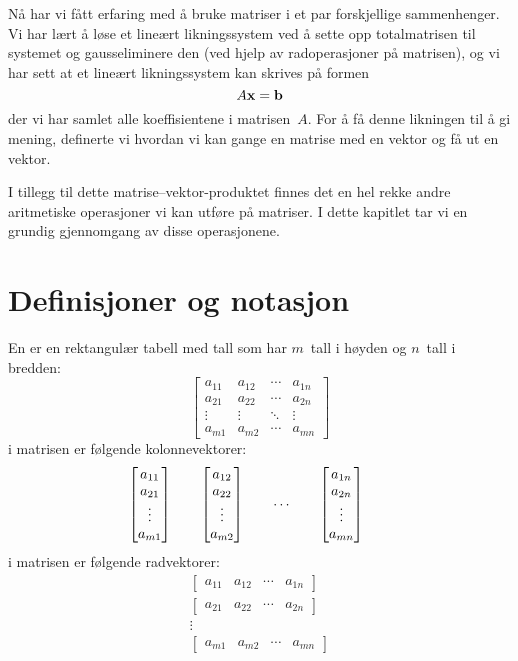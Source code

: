 

\label{ch:matriser}

Nå har vi fått erfaring med å bruke matriser i et par forskjellige
sammenhenger.  Vi har lært å løse et lineært likningssystem ved å
sette opp totalmatrisen til systemet og gausseliminere den (ved hjelp
av radoperasjoner på matrisen), og vi har sett at et lineært
likningssystem kan skrives på formen
\[
A \mathbf{x} = \mathbf{b}
\]
der vi har samlet alle koeffisientene i matrisen~$A$.  For å få denne
likningen til å gi mening, definerte vi hvordan vi kan gange en
matrise med en vektor og få ut en vektor.

I tillegg til dette matrise--vektor-produktet finnes det en hel rekke
andre aritmetiske operasjoner vi kan utføre på matriser.  I dette
kapitlet tar vi en grundig gjennomgang av disse operasjonene.


\section*{Definisjoner og notasjon}



En  er en rektangulær tabell med tall
som har $m$~tall i høyden og $n$~tall i bredden:
\[
\begin{bmatrix}
a_{11} & a_{12} & \cdots & a_{1n} \\
a_{21} & a_{22} & \cdots & a_{2n} \\
\vdots & \vdots & \ddots & \vdots \\
a_{m1} & a_{m2} & \cdots & a_{mn}
\end{bmatrix}
\]
 i matrisen er følgende kolonnevektorer:
\[
\begin{bmatrix} a_{11} \\ a_{21} \\ \vdots \\ a_{m1} \end{bmatrix}\qquad
\begin{bmatrix} a_{12} \\ a_{22} \\ \vdots \\ a_{m2} \end{bmatrix}\qquad
\cdots\qquad
\begin{bmatrix} a_{1n} \\ a_{2n} \\ \vdots \\ a_{mn} \end{bmatrix}\qquad
\]
 i matrisen er følgende radvektorer:
\begin{gather*}
\begin{bmatrix}
a_{11} & a_{12} & \cdots & a_{1n}
\end{bmatrix}
\\
\begin{bmatrix}
a_{21} & a_{22} & \cdots & a_{2n}
\end{bmatrix}
\\
\vdots
\\
\begin{bmatrix}
a_{m1} & a_{m2} & \cdots & a_{mn}
\end{bmatrix}
\end{gather*}

